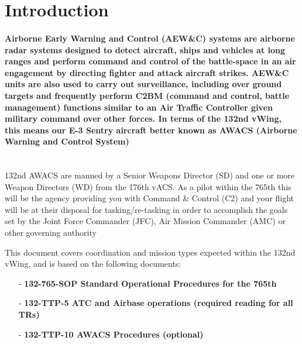 \section*{Introduction}
  \paragraph{
  	Airborne Early Warning and Control (AEW\&C) systems are airborne radar systems designed to detect aircraft, ships and vehicles at long ranges and perform command and control of the battle-space in an air engagement by directing fighter and attack aircraft strikes. AEW\&C units are also used to carry out surveillance, including over ground targets and frequently perform C2BM (command and control, battle management) functions similar to an Air Traffic Controller given military command over other forces. In terms of the 132nd vWing, this means our E-3 Sentry aircraft better known as AWACS (Airborne Warning and Control System) \\ \\
  }
  
  \textnormal{
  	132nd AWACS are manned by a Senior Weapons Director (SD) and one or more Weapon Directors (WD) from the 176th vACS. As a pilot within the 765th this will be the agency providing you with Command \& Control (C2) and your flight will be at their disposal for tasking/re-tasking in order to accomplish the goals set by the Joint Force Commander (JFC), Air Mission Commander (AMC) or other governing authority \\
  }
  
  \textnormal{
  	This document covers coordination and mission types expected within the 132nd vWing, and is based on the following documents:
  }
  
  \footnotesize
  \begin{itemize}
  \item[-] \textbf{132-765-SOP Standard Operational Procedures for the 765th}
  \item[-] \textbf{132-TTP-5 ATC and Airbase operations (required reading for all TRs)}
  \item[-] \textbf{132-TTP-10 AWACS Procedures (optional)}
  \end{itemize}
  
  \normalsize
